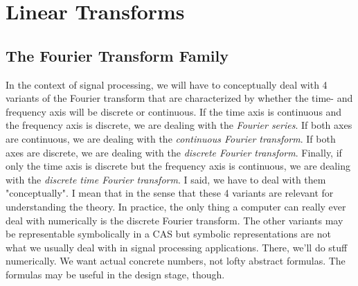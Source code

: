 
% 


\section{Linear Transforms}

\subsection{The Fourier Transform Family}
In the context of signal processing, we will have to conceptually deal with 4 variants of the Fourier transform that are characterized by whether the time- and frequency axis will be discrete or continuous. If the time axis is continuous and the frequency axis is discrete, we are dealing with the \emph{Fourier series}. If both axes are continuous, we are dealing with the \emph{continuous Fourier transform}. If both axes are discrete, we are dealing with the \emph{discrete Fourier transform}. Finally, if only the time axis is discrete but the frequency axis is continuous, we are dealing with the \emph{discrete time Fourier transform}. I said, we have to deal with them "conceptually". I mean that in the sense that these 4 variants are relevant for understanding the theory. In practice, the only thing a computer can really ever deal with numerically is the discrete Fourier transform. The other variants may be representable symbolically in a CAS but symbolic representations are not what we usually deal with in signal processing applications. There, we'll do stuff numerically. We want actual concrete numbers, not lofty abstract formulas. The formulas may be useful in the design stage, though.


